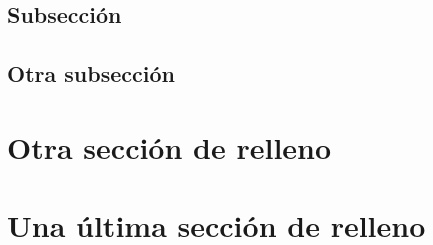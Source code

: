 \documentclass[12pt,a4paper,twoside]{article}
\begin{document}
\lipsum[1-15]

\subsection{Subsección}

\lipsum[1-15]

\subsection{Otra subsección}

\lipsum[1-15]		

\section{Otra sección de relleno}

\lipsum[1-15]		

\section{Una última sección de relleno}

\lipsum[1-15]
\end{document}
